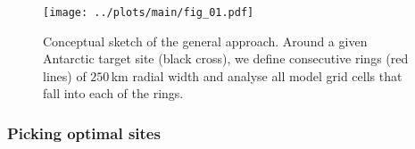 \documentclass[cp, manuscript]{copernicus}
\begin{document}
\begin{figure}[t]%
\centering
\texttt{[image: ../plots/main/fig\_01.pdf]}
\caption[Conceptual approach]{%
  Conceptual sketch of the general approach. Around a given Antarctic target
  site (black cross), we define consecutive rings (red lines) of $250$\,km
  radial width and analyse all model grid cells that fall into each of the
  rings.}
\label{fig:concept}%
\end{figure}%




\subsubsection{Picking optimal sites}\label{methods:picking}
\end{document}
